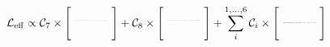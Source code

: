 \begin{equation*}
    \mathcal{L}_{\mathrm{eff}} \propto
\mathcal{C}_7 \times
\Biggl[
\raisebox{5pt}{
\resizebox{0.085\textwidth}{!}{
\feynmandiagram [small, inline=(b.base), vertical=b to d] {
    a --  b [dot] -- c,
    b -- [boson] d [particle={\LARGE$\gamma$}],
    };
}
}\Biggr]
+
\mathcal{C}_8 \times
\Biggl[
\raisebox{5pt}{
\resizebox{0.085\textwidth}{!}{
\feynmandiagram [small, inline=(b.base), vertical=b to d] {
    a --  b [dot] --  c,
    b -- [boson] d [particle={\LARGE$g$}],
    };
}
}\Biggr]
+
\sum_i^{1,...,6}
\mathcal{C}_i\times
\Biggl[
\raisebox{3pt}{
\resizebox{0.085\textwidth}{!}{
\feynmandiagram [small, inline=(b.base), horizontal=a to c] {
    a --  b [dot] --  c,
    d --  b -- e,
    };
}
}\Biggr]
\end{equation*}